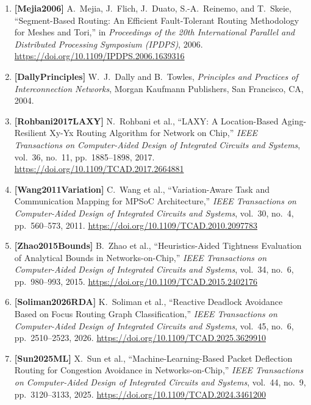 \begin{enumerate}
    \item \textbf{[Mejia2006]} A.~Mejia, J.~Flich, J.~Duato, S.-A.~Reinemo, and T.~Skeie, ``Segment-Based Routing: An Efficient Fault-Tolerant Routing Methodology for Meshes and Tori,'' in \emph{Proceedings of the 20th International Parallel and Distributed Processing Symposium (IPDPS)}, 2006. \url{https://doi.org/10.1109/IPDPS.2006.1639316}
    \item \textbf{[DallyPrinciples]} W.~J.~Dally and B.~Towles, \emph{Principles and Practices of Interconnection Networks}, Morgan Kaufmann Publishers, San Francisco, CA, 2004.
    \item \textbf{[Rohbani2017LAXY]} N.~Rohbani et al., ``LAXY: A Location-Based Aging-Resilient Xy-Yx Routing Algorithm for Network on Chip,'' \emph{IEEE Transactions on Computer-Aided Design of Integrated Circuits and Systems}, vol.~36, no.~11, pp.~1885--1898, 2017. \url{https://doi.org/10.1109/TCAD.2017.2664881}
    \item \textbf{[Wang2011Variation]} C.~Wang et al., ``Variation-Aware Task and Communication Mapping for MPSoC Architecture,'' \emph{IEEE Transactions on Computer-Aided Design of Integrated Circuits and Systems}, vol.~30, no.~4, pp.~560--573, 2011. \url{https://doi.org/10.1109/TCAD.2010.2097783}
    \item \textbf{[Zhao2015Bounds]} B.~Zhao et al., ``Heuristics-Aided Tightness Evaluation of Analytical Bounds in Networks-on-Chip,'' \emph{IEEE Transactions on Computer-Aided Design of Integrated Circuits and Systems}, vol.~34, no.~6, pp.~980--993, 2015. \url{https://doi.org/10.1109/TCAD.2015.2402176}
    \item \textbf{[Soliman2026RDA]} K.~Soliman et al., ``Reactive Deadlock Avoidance Based on Focus Routing Graph Classification,'' \emph{IEEE Transactions on Computer-Aided Design of Integrated Circuits and Systems}, vol.~45, no.~6, pp.~2510--2523, 2026. \url{https://doi.org/10.1109/TCAD.2025.3629910}
    \item \textbf{[Sun2025ML]} X.~Sun et al., ``Machine-Learning-Based Packet Deflection Routing for Congestion Avoidance in Networks-on-Chip,'' \emph{IEEE Transactions on Computer-Aided Design of Integrated Circuits and Systems}, vol.~44, no.~9, pp.~3120--3133, 2025. \url{https://doi.org/10.1109/TCAD.2024.3461200}
\end{enumerate}
